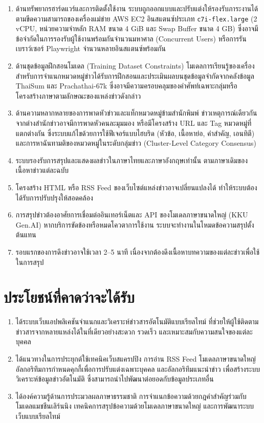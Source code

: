 \begin{enumerate}[label=\arabic*)]
    \item ด้านทรัพยากรฮาร์ดแวร์และการติดตั้งใช้งาน ระบบถูกออกแบบและปรับแต่งให้รองรับภาระงานได้ตามขีดความสามารถของเครื่องแม่ข่าย AWS EC2 อินสแตนซ์ประเภท \texttt{c7i-flex.large} (2 vCPU, หน่วยความจำหลัก RAM ขนาด 4 GiB และ Swap Buffer ขนาด 4 GB) ซึ่งอาจมีข้อจำกัดในการรองรับผู้ใช้งานพร้อมกันจำนวนมหาศาล (Concurrent Users) หรือการรันเบราว์เซอร์ Playwright จำนวนหลายอินสแตนซ์พร้อมกัน
    \item ด้านชุดข้อมูลฝึกสอนโมเดล (Training Dataset Constraints) โมเดลการเรียนรู้ของเครื่องสำหรับการจำแนกหมวดหมู่ข่าวได้รับการฝึกสอนและประเมินผลบนชุดข้อมูลจำกัดจากคลังข้อมูล ThaiSum และ Prachathai-67k ซึ่งอาจมีความครอบคลุมของคำศัพท์เฉพาะกลุ่มหรือโครงสร้างภาษาตามลักษณะของแหล่งข่าวดังกล่าว
    \item ด้านความหลากหลายของการพาดหัวข่าวและแท็กหมวดหมู่ข้ามสำนักพิมพ์ ข่าวเหตุการณ์เดียวกันจากต่างสำนักข่าวอาจมีการพาดหัวคนละมุมมอง หรือมีโครงสร้าง URL และ Tag หมวดหมู่ที่แตกต่างกัน ซึ่งระบบแก้ไขด้วยการใช้ฟีเจอร์แบบไฮบริด (หัวข้อ, เนื้อหาย่อ, คำสำคัญ, เอนทิตี) และการหาฉันทามติของหมวดหมู่ในระดับกลุ่มข่าว (Cluster-Level Category Consensus)
    \item ระบบรองรับการสรุปและแสดงผลข่าวในภาษาไทยและภาษาอังกฤษเท่านั้น ตามภาษาเดิมของเนื้อหาข่าวแต่ละฉบับ
    \item โครงสร้าง HTML หรือ RSS Feed ของเว็บไซต์แหล่งข่าวอาจเปลี่ยนแปลงได้ ทำให้ระบบต้องได้รับการปรับปรุงให้สอดคล้อง
    \item การสรุปข่าวต้องอาศัยการเชื่อมต่ออินเทอร์เน็ตและ API ของโมเดลภาษาขนาดใหญ่ (KKU Gen.AI) หากบริการขัดข้องหรือหมดโควตาการใช้งาน ระบบจะทำงานในโหมดข้อความสรุปตั้งต้นแทน
    \item รอบแรกของการดึงข่าวอาจใช้เวลา 2--5 นาที เนื่องจากต้องดึงเนื้อหาบทความของแต่ละข่าวเพื่อใช้ในการสรุป
\end{enumerate}

\section{ประโยชน์ที่คาดว่าจะได้รับ}

\begin{enumerate}[label=\arabic*)]
    \item ได้ระบบเว็บแอปพลิเคชันจำแนกและวิเคราะห์ข่าวสารอัตโนมัติแบบเรียลไทม์ ที่ช่วยให้ผู้ใช้ติดตามข่าวสารจากหลายแหล่งได้ในที่เดียวอย่างสะดวก รวดเร็ว และเหมาะสมกับความสนใจของแต่ละบุคคล
    \item ได้แนวทางในการประยุกต์ใช้เทคนิคเว็บสแครปปิง การอ่าน RSS Feed โมเดลภาษาขนาดใหญ่ อัลกอริทึมการกำหนดคุกกี้เพื่อการปรับแต่งเฉพาะบุคคล และอัลกอริทึมแนะนำข่าว เพื่อสร้างระบบวิเคราะห์ข้อมูลข่าวอัตโนมัติ ซึ่งสามารถนำไปพัฒนาต่อยอดกับข้อมูลประเภทอื่น
    \item ได้องค์ความรู้ด้านการประมวลผลภาษาธรรมชาติ การจำแนกข้อความด้วยกฎคำสำคัญร่วมกับโมเดลแมชชีนเลิร์นนิง เทคนิคการสรุปข้อความด้วยโมเดลภาษาขนาดใหญ่ และการพัฒนาระบบเว็บแบบเรียลไทม์
\end{enumerate}

